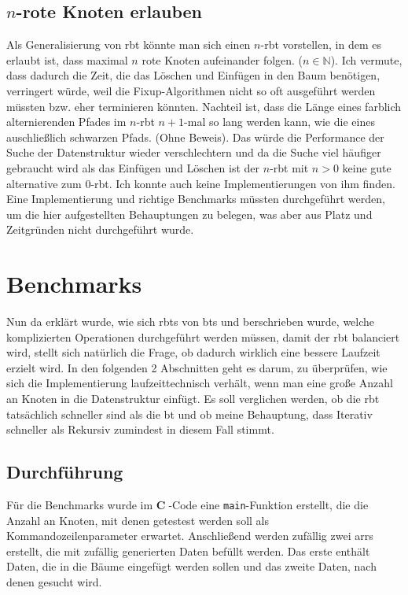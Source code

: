 \documentclass[11pt]{article}
\newcommand{\lstin}[1]{\lstinline[language=C]{#1}}
\newcommand{\cpl}{\textbf{C}$\;$}
\begin{document}
\subsection{$n$-rote Knoten erlauben}
Als Generalisierung von \gls{rbt} könnte man sich einen $n$-\gls{rbt} vorstellen, in dem es erlaubt ist, dass maximal $n$ rote Knoten aufeinander folgen. ($n \in \mathbb{N}$). 
Ich vermute, dass dadurch die Zeit, die das Löschen und Einfügen in den Baum benötigen, verringert würde, weil die Fixup-Algorithmen nicht so oft ausgeführt werden müssten bzw. eher terminieren könnten.\cite[S. 301]{btrees}
Nachteil ist, dass die Länge eines farblich alternierenden Pfades im $n$-\gls{rbt} $n+1$-mal so lang werden kann, wie die eines auschließlich schwarzen Pfads. (Ohne Beweis).
Das würde die Performance der Suche der Datenstruktur wieder verschlechtern und da die Suche viel häufiger gebraucht wird als das Einfügen und Löschen ist der $n$-\gls{rbt} mit $n > 0$
keine gute alternative zum $0$-\gls{rbt}. Ich konnte auch keine Implementierungen von ihm finden.
Eine Implementierung und richtige Benchmarks müssten durchgeführt werden, um die hier aufgestellten Behauptungen zu belegen, was aber aus Platz und Zeitgründen nicht durchgeführt wurde. 

\pagebreak
\section{Benchmarks}

Nun da erklärt wurde, wie sich \glspl{rbt} von \glspl{bt} und berschrieben wurde, welche komplizierten Operationen durchgeführt werden müssen, damit der \gls{rbt} balanciert wird,
stellt sich natürlich die Frage, ob dadurch wirklich eine bessere Laufzeit erzielt wird.
In den folgenden 2 Abschnitten geht es darum, zu überprüfen, wie sich die Implementierung laufzeittechnisch verhält, wenn man eine große Anzahl an Knoten in die Datenstruktur einfügt.
Es soll verglichen werden, ob die \gls{rbt} tatsächlich schneller sind als die \gls{bt} und ob meine Behauptung, dass Iterativ schneller als Rekursiv zumindest in diesem Fall stimmt. 

\subsection{Durchführung}
Für die Benchmarks wurde im \cpl-Code eine \lstin{main}-Funktion erstellt, die die Anzahl an Knoten, mit denen getestest werden soll als Kommandozeilenparameter erwartet.
Anschließend werden zufällig zwei \glspl{arr} erstellt, die mit zufällig generierten Daten befüllt werden. Das erste enthält Daten, die in die Bäume eingefügt werden sollen und das zweite Daten, nach denen gesucht wird.
\end{document}
